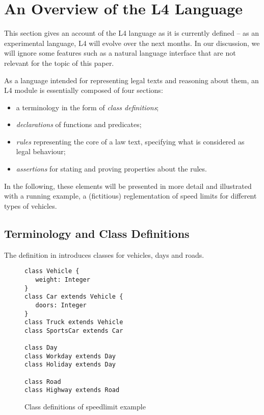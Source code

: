 \section{An Overview of the L4 Language}\label{sec:l4_language}

This section gives an account of the L4 language as it is currently defined --
as an experimental language, L4 will evolve over the next months. In our
discussion, we will ignore some features such as a natural language interface
\cite{} that are not relevant for the topic of this paper.

As a language intended for representing legal texts and reasoning about them,
an L4 module is essentially composed of four sections:
\begin{itemize}
\item a terminology in the form of \emph{class definitions};
\item \emph{declarations} of functions and predicates;
\item \emph{rules} representing the core of a law text, specifying what is
  considered as legal behaviour;
\item \emph{assertions} for stating and proving properties about the rules.
\end{itemize}

In the following, these elements will be presented in more detail and
illustrated with a running example, a (fictitious) reglementation of speed
limits for different types of vehicles.


\subsection{Terminology and Class Definitions}\label{sec:classdefs}

The definition in  introduces classes for vehicles, days
and roads. 

\begin{figure}[h!]
\begin{lstlisting}
class Vehicle {
   weight: Integer
}
class Car extends Vehicle {
   doors: Integer
}
class Truck extends Vehicle
class SportsCar extends Car

class Day
class Workday extends Day
class Holiday extends Day

class Road
class Highway extends Road
\end{lstlisting}
  \caption{Class definitions of speedlimit example}\label{fig:classdefs}
\end{figure}

